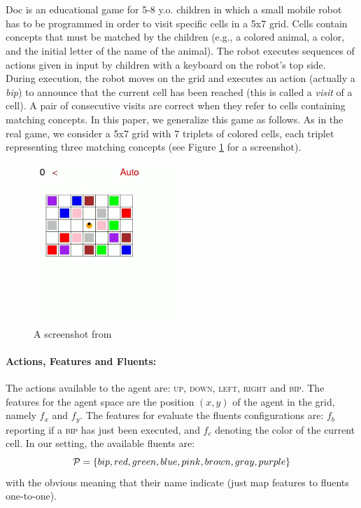 \section{\Sapientino}
\Sapientino Doc is an educational
game for 5-8 y.o. children in which a small mobile robot
has to be programmed in order to visit specific cells in a 5x7
grid. Cells contain concepts that must be matched by the
children (e.g., a colored animal, a color, and the initial letter
of the name of the animal). The robot executes sequences
of actions given in input by children with a keyboard on the
robot's top side. During execution, the robot moves on the
grid and executes an action (actually a \emph{bip}) to announce that
the current cell has been reached (this is called a \emph{visit} of a
cell). A pair of consecutive visits are correct when they refer to cells containing matching concepts. In this paper, we
generalize this game as follows. As in the real game, we consider a 5x7 grid with 7 triplets of colored cells, each triplet
representing three matching concepts (see Figure \ref{fig:sapientino-screenshot} for a screenshot).

\begin{figure}[h]
	\centering
	\includegraphics[width=0.5\textwidth]{images/sapientino-start-screen.png}
	\caption{A screenshot from \Sapientino}
	\label{fig:sapientino-screenshot}
\end{figure}

\paragraph{Actions, Features and Fluents:}  The actions available to the agent are: \textsc{up, down, left, right} and \textsc{bip}. The features for the agent space are the position $(x,y)$ of the agent in the grid, namely $f_x$ and $f_y$. The features for evaluate the fluents configurations are: $f_b$ reporting if a \textsc{bip} has just been executed, and $f_c$ denoting the color of the current cell. In our setting, the available fluents are: $$\mathcal{P} = \{bip, red, green, blue, pink, brown, gray, purple\}$$ with the obvious meaning that their name indicate (just map features to fluents one-to-one).

